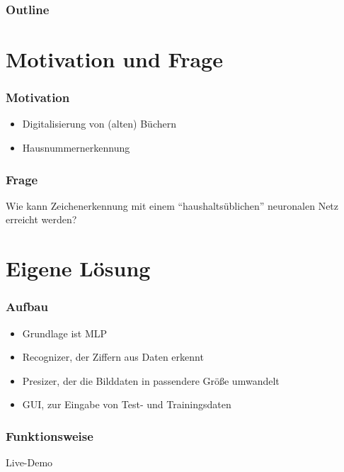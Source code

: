 \documentclass[14pt]{beamer}
\institute{Universit\"at Hamburg\\\trinstitute}
\title{\trtitle}
\subtitle{\trtype}
\author{\trauthor}
\date{}
\theoremstyle{remark}
\begin{document}
\renewcommand{\arraystretch}{1.2}

\begin{frame}[plain] %
  \titlepage
\end{frame}

\begin{frame}
	\frametitle{Outline}
	\tableofcontents
\end{frame}


\section{Motivation und Frage}
\begin{frame}
	\frametitle{Motivation}
	\begin{itemize}
		\item Digitalisierung von (alten) Büchern
		\item Hausnummernerkennung
	\end{itemize}
\end{frame}

\begin{frame}
	\frametitle{Frage}
	\centering
	Wie kann Zeichenerkennung mit einem "`haushaltsüblichen"' neuronalen Netz erreicht werden?
\end{frame}

\section{Eigene Lösung}
\begin{frame}
	\frametitle{Aufbau}
	\begin{itemize}
		\item Grundlage ist MLP
		\item Recognizer, der Ziffern aus Daten erkennt
		\item Presizer, der die Bilddaten in passendere Größe umwandelt
		\item GUI, zur Eingabe von Test- und Trainingsdaten
	\end{itemize}
\end{frame}

\begin{frame}
	\frametitle{Funktionsweise}
	\centering
	Live-Demo
\end{frame}
\end{document}
